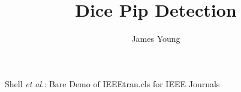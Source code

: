 \documentclass[journal]{IEEEtran}
\begin{document}
%
\title{Dice Pip Detection}
%
%
%

\author{James Young}

% 
%



%
{Shell \MakeLowercase{\textit{et al.}}: Bare Demo of IEEEtran.cls for IEEE Journals}
% 
\end{document}

